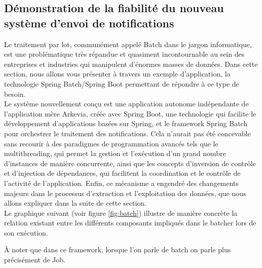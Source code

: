 \subsection{Démonstration de la fiabilité du nouveau système d'envoi de notifications}
Le traitement par lot, communément appelé Batch dans le jargon informatique, est une problématique très répandue et quasiment incontournable au sein des entreprises et industries qui manipulent d’énormes masses de données. Dans cette section, nous allons vous présenter à travers un exemple d’application, la technologie Spring Batch/Spring Boot permettant de répondre à ce type de besoin.\\

Le système nouvellement conçu est une application autonome indépendante de l'application mère Arkevia, créée avec Spring Boot, une technologie qui facilite le développement d'applications basées sur Spring, et le framework Spring Batch pour orchestrer le traitement des notifications. Cela n'aurait pas été concevable sans recourir à des paradigmes de programmation avancés tels que le multithreading, qui permet la gestion et l'exécution d'un grand nombre d'instances de manière concurrente, ainsi que les concepts d'inversion de contrôle et d'injection de dépendances, qui facilitent la coordination et le contrôle de l'activité de l'application. Enfin, ce mécanisme a engendré des changements majeurs dans le processus d'extraction et l'exploitation des données, que nous allons expliquer dans la suite de cette section.\\

Le graphique suivant (voir figure \ref{fig:batch}) illustre de manière concrète la relation existant entre les différents composants impliqués dans le batcher lors de son exécution.
\begin{beware}[title=Note : ]
À noter que dans ce framework, lorsque l’on parle de batch on parle plus précisément de Job.
\end{beware}
    
